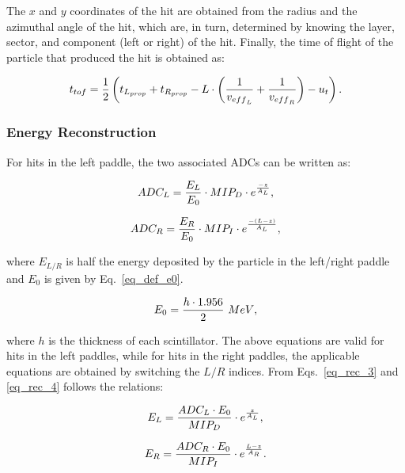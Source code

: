 \documentclass{elsart}
\begin{document}
The $x$ and $y$ coordinates of the hit are obtained from the radius and the azimuthal angle of the hit, which
are, in turn, determined by knowing the layer, sector, and component (left or right) of the hit.  Finally, the time
of flight of the particle that produced the hit is obtained as:

\begin{equation}
t_{\rm{tof}}= \frac{1}{2}\left(t_{\rm{L}_{\rm{prop}}}+t_{\rm{R}_{\rm{prop}}}- L \cdot \left(\frac{1}{v_{\rm{eff}_{\rm{L}}}}
+\frac{1}{v_{\rm{eff}_{\rm{R}}}}\right)  -u_{\rm{t}}\right).
\end{equation}

\subsubsection{Energy Reconstruction}

For hits in the left paddle, the two associated ADCs can be written as:

\begin{equation}
\label{eq_rec_3}
ADC_{\rm{L}}=\frac{E_{\rm{L}}}{E_0}\cdot MIP_{\rm{D}}\cdot e^{\frac{-z}{A_{\rm{L}}}},
\end{equation}

\begin{equation}
\label{eq_rec_4}
ADC_{\rm{R}}=\frac{E_{\rm{R}}}{E_0}\cdot MIP_{\rm{I}}\cdot e^{\frac{-(L-z)}{A_{\rm{L}}}},
\end{equation}

\noindent
where $E_{L/R}$ is half the energy deposited by the particle in the left/right paddle and $E_0$ is given by
Eq.~\ref{eq_def_e0}.

\begin{equation}\label{eq_def_e0}
E_0=\frac{h\cdot 1.956}{2}~\rm{MeV},
\end{equation}

\noindent
where $h$ is the thickness of each scintillator. The above equations are valid for hits in the left paddles, while
for hits in the right paddles, the applicable equations are obtained by switching the $L/R$ indices. From
Eqs.~\ref{eq_rec_3} and \ref{eq_rec_4} follows the relations:

\begin{equation}
E_{\rm{L}}=\frac{ADC_{\rm{L}} \cdot E_0}{MIP_{\rm{D}}}\cdot e^{\frac{z}{A_{\rm{L}}}},
\end{equation}

\begin{equation}
E_{\rm{R}}=\frac{ADC_{\rm{R}} \cdot E_0}{MIP_{\rm{I}}}\cdot e^{\frac{L-z}{A_{\rm{R}}}}.
\end{equation}
\end{document}
